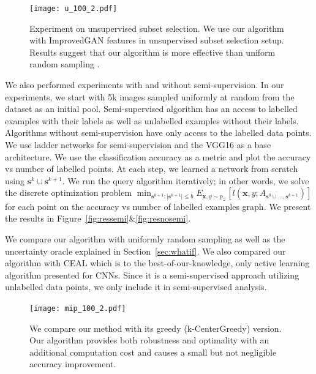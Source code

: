 \documentclass{article}
\begin{document}
\begin{figure}
\texttt{[image: u\_100\_2.pdf]}
\caption{Experiment on unsupervised subset selection. We use our algorithm with ImprovedGAN\cite{improved_gan} features in unsupervised subset selection setup. Results suggest that our algorithm is more effective than uniform random sampling .}
\label{fig:scat}
\end{figure}

We also performed experiments with and without semi-supervision. In our experiments, we start with 5k images sampled uniformly at random from the dataset as an initial pool. Semi-supervised algorithm has an access to labelled examples with their labels as well as unlabelled examples without their labels. Algorithms without semi-supervision have only access to the labelled data points. We use ladder networks\cite{ladder} for semi-supervision and the VGG16\cite{vgg} as a base architecture. We use the classification accuracy as a metric and plot the accuracy vs number of labelled points. At each step, we learned a network from scratch using $\mathbf{s}^{k} \cup \mathbf{s}^{k+1}$. We run the query algorithm iteratively; in other words, we solve the discrete optimization problem $\min_{\mathbf{s}^{k+1} : |\mathbf{s}^{k+1}| \leq b} E_{\mathbf{x},y \sim p_\mathcal{Z}} [l(\mathbf{x},y; A_{\mathbf{s}^{0} \cup \ldots, \mathbf{s}^{k+1}})]$ for each point on the accuracy vs number of labelled examples graph. We present the results in Figure~\ref{fig:ressemi}\&\ref{fig:resnosemi}.

We compare our algorithm with uniformly random sampling as well as the uncertainty oracle explained in Section~\ref{sec:whatif}. We also compared our algorithm with CEAL \cite{wang2016cost} which is to the best-of-our-knowledge, only active learning algorithm presented for CNNs. Since it is a semi-supervised approach utilizing unlabelled data points, we only include it in semi-supervised analysis.

 \begin{figure}
\texttt{[image: mip\_100\_2.pdf]}
\caption{We compare our method with its greedy (k-CenterGreedy) version. Our algorithm provides both robustness and optimality with an additional computation cost and causes a small but not negligible accuracy improvement. }
\label{fig:twoopt}
\end{figure}
\end{document}
